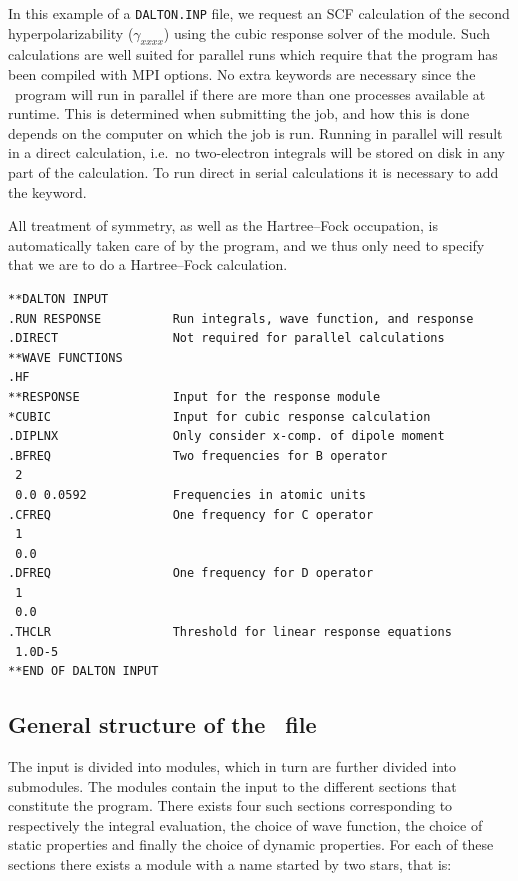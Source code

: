 In this example of a \verb|DALTON.INP| file, we request an SCF
calculation of the second
hyperpolarizability
($\gamma_{xxxx}$) using
the cubic response solver
of the {\resp} module. Such calculations are well suited for parallel runs
which require that the program has been compiled with MPI options. No extra
keywords are necessary since the \dalton\ program will run in parallel if there are more than one processes available at runtime. This is determined when
submitting the job, and how this is done depends on the computer on which the
job is run. Running in parallel will result in a direct calculation, i.e.\
no two-electron integrals will be stored on disk in any part of the
calculation. To run direct in serial calculations it is necessary to add the  keyword.

All treatment  of symmetry, as well as the Hartree--Fock
occupation, is
automatically taken care of by the program, and we thus only need to
specify that we are to do a Hartree--Fock calculation.

\begin{verbatim}
**DALTON INPUT
.RUN RESPONSE          Run integrals, wave function, and response
.DIRECT                Not required for parallel calculations
**WAVE FUNCTIONS
.HF
**RESPONSE             Input for the response module
*CUBIC                 Input for cubic response calculation
.DIPLNX                Only consider x-comp. of dipole moment
.BFREQ                 Two frequencies for B operator
 2
 0.0 0.0592            Frequencies in atomic units
.CFREQ                 One frequency for C operator
 1
 0.0
.DFREQ                 One frequency for D operator
 1
 0.0
.THCLR                 Threshold for linear response equations
 1.0D-5
**END OF DALTON INPUT
\end{verbatim}


\subsection{General structure of the \dalinp\ file}\label{sec:inputstructure}

The input is divided into modules, which in turn are
further divided into submodules\index{submodule}. The modules contain
the input to the different
sections that constitute the {\dalton} program. There exists
four such sections corresponding to respectively the integral
evaluation, the choice of wave function, the
choice of static properties\index{molecular properties} and finally
the choice of dynamic properties\index{response}. For each of
these sections there exists a module with a name started by two stars,
that is:

